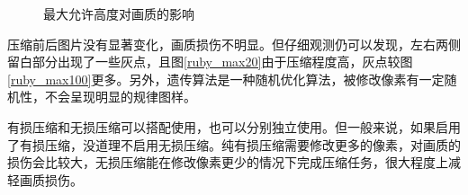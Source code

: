 \documentclass[UTF8]{ctexart}
\begin{document}
    \begin{figure}[htbp]
        \centering
        \caption{最大允许高度对画质的影响}
    \end{figure}

    压缩前后图片没有显著变化，画质损伤不明显。但仔细观测仍可以发现，左右两侧留白部分出现了一些灰点，且图\ref*{ruby_max20}由于压缩程度高，灰点较图\ref*{ruby_max100}更多。另外，遗传算法是一种随机优化算法，被修改像素有一定随机性，不会呈现明显的规律图样。

    有损压缩和无损压缩可以搭配使用，也可以分别独立使用。但一般来说，如果启用了有损压缩，没道理不启用无损压缩。纯有损压缩需要修改更多的像素，对画质的损伤会比较大，无损压缩能在修改像素更少的情况下完成压缩任务，很大程度上减轻画质损伤。
    
\end{document}
